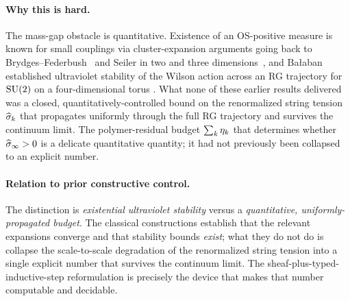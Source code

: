 \paragraph*{Why this is hard.}  The mass-gap obstacle is
quantitative.  Existence of an OS-positive measure is known for
small couplings via cluster-expansion arguments going back to
Brydges--Federbush~\cite{BrydgesFederbush1978} and Seiler in two
and three dimensions~\cite{Seiler1982}, and Bałaban established
ultraviolet stability of the Wilson action across an RG trajectory
for $\mathrm{SU}(2)$ on a four-dimensional torus
\cite{Balaban1987RG-I,Balaban1988RG-II,Balaban1988convergent}.
What none of these earlier results delivered was a closed,
quantitatively-controlled bound on the renormalized string tension
$\widehat{\sigma}_k$ that propagates uniformly through the full RG trajectory
and survives the continuum limit.  The polymer-residual budget
$\sum_k \eta_k$ that determines whether $\widehat{\sigma}_\infty > 0$ is a
delicate quantitative quantity; it had not previously been
collapsed to an explicit number.

\paragraph*{Relation to prior constructive control.}  The distinction
is \emph{existential ultraviolet stability} versus a
\emph{quantitative, uniformly-propagated budget}.  The classical
constructions establish that the relevant expansions converge and
that stability bounds \emph{exist}; what they do not do is collapse
the scale-to-scale degradation of the renormalized string tension into
a single explicit number that survives the continuum limit.  The
sheaf-plus-typed-inductive-step reformulation is precisely the device
that makes that number computable and decidable.

